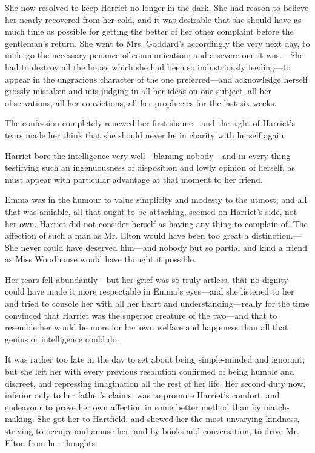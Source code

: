 She now resolved to keep Harriet no longer in the dark. She had reason to believe her nearly recovered from her cold, and it was desirable that she should have as much time as possible for getting the better of her other complaint before the gentleman's return. She went to Mrs. Goddard's accordingly the very next day, to undergo the necessary penance of communication; and a severe one it was.---She had to destroy all the hopes which she had been so industriously feeding---to appear in the ungracious character of the one preferred---and acknowledge herself grossly mistaken and mis-judging in all her ideas on one subject, all her observations, all her convictions, all her prophecies for the last six weeks.

The confession completely renewed her first shame---and the sight of Harriet's tears made her think that she should never be in charity with herself again.

Harriet bore the intelligence very well---blaming nobody---and in every thing testifying such an ingenuousness of disposition and lowly opinion of herself, as must appear with particular advantage at that moment to her friend.

Emma was in the humour to value simplicity and modesty to the utmost; and all that was amiable, all that ought to be attaching, seemed on Harriet's side, not her own. Harriet did not consider herself as having any thing to complain of. The affection of such a man as Mr. Elton would have been too great a distinction.---She never could have deserved him---and nobody but so partial and kind a friend as Miss Woodhouse would have thought it possible.

Her tears fell abundantly---but her grief was so truly artless, that no dignity could have made it more respectable in Emma's eyes---and she listened to her and tried to console her with all her heart and understanding---really for the time convinced that Harriet was the superior creature of the two---and that to resemble her would be more for her own welfare and happiness than all that genius or intelligence could do.

It was rather too late in the day to set about being simple-minded and ignorant; but she left her with every previous resolution confirmed of being humble and discreet, and repressing imagination all the rest of her life. Her second duty now, inferior only to her father's claims, was to promote Harriet's comfort, and endeavour to prove her own affection in some better method than by match-making. She got her to Hartfield, and shewed her the most unvarying kindness, striving to occupy and amuse her, and by books and conversation, to drive Mr. Elton from her thoughts.


